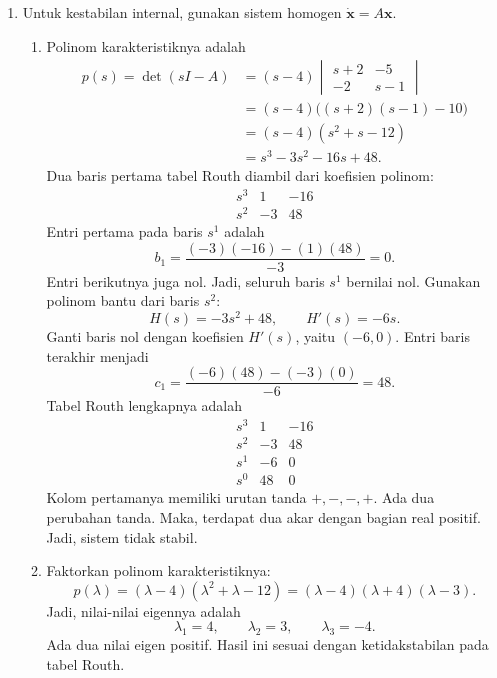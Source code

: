 \documentclass[11pt,a4paper]{article}
\newcommand{\xx}{\mathbf{x}}
\begin{document}
\begin{enumerate}[itemsep=12pt,parsep=5pt]
  \item Untuk kestabilan internal, gunakan sistem homogen $\dot{\xx}=A\xx$.
        \begin{enumerate}
          \item Polinom karakteristiknya adalah
                \begin{align*}
                  p(s)=\det(sI-A)
                    &=(s-4)\begin{vmatrix}s+2&-5\\-2&s-1\end{vmatrix}\\
                    &=(s-4)\bigl((s+2)(s-1)-10\bigr)\\
                    &=(s-4)(s^2+s-12)\\
                    &=s^3-3s^2-16s+48.
                \end{align*}
                Dua baris pertama tabel Routh diambil dari koefisien polinom:
                \[
                  \begin{array}{c|rr}
                    s^3&1&-16\\
                    s^2&-3&48
                  \end{array}
                \]
                Entri pertama pada baris $s^1$ adalah
                \[
                  b_1=\frac{(-3)(-16)-(1)(48)}{-3}=0.
                \]
                Entri berikutnya juga nol.
                Jadi, seluruh baris $s^1$ bernilai nol.
                Gunakan polinom bantu dari baris $s^2$:
                \[
                  H(s)=-3s^2+48,\qquad H'(s)=-6s.
                \]
                Ganti baris nol dengan koefisien $H'(s)$, yaitu $(-6,0)$.
                Entri baris terakhir menjadi
                \[
                  c_1=\frac{(-6)(48)-(-3)(0)}{-6}=48.
                \]
                Tabel Routh lengkapnya adalah
                \[
                  \begin{array}{c|rr}
                    s^3&1&-16\\
                    s^2&-3&48\\
                    s^1&-6&0\\
                    s^0&48&0
                  \end{array}
                \]
                Kolom pertamanya memiliki urutan tanda $+,-,-,+$.
                Ada dua perubahan tanda.
                Maka, terdapat dua akar dengan bagian real positif.
                Jadi, sistem tidak stabil.

          \item Faktorkan polinom karakteristiknya:
                \[
                  p(\lambda)=(\lambda-4)(\lambda^2+\lambda-12)
                            =(\lambda-4)(\lambda+4)(\lambda-3).
                \]
                Jadi, nilai-nilai eigennya adalah
                \[
                  \lambda_1=4,\qquad\lambda_2=3,\qquad\lambda_3=-4.
                \]
                Ada dua nilai eigen positif.
                Hasil ini sesuai dengan ketidakstabilan pada tabel Routh.
        \end{enumerate}
\end{enumerate}
\end{document}
